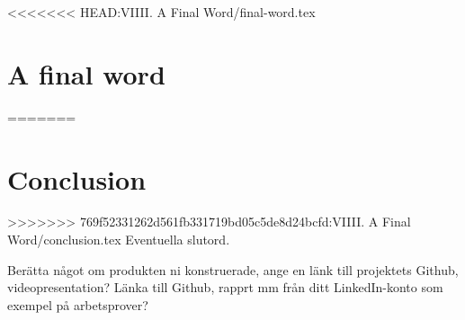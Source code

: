 <<<<<<< HEAD:VIIII. A Final Word/final-word.tex
\section*{A final word}
=======
\section*{Conclusion}
>>>>>>> 769f52331262d561fb331719bd05c5de8d24bcfd:VIIII. A Final Word/conclusion.tex
Eventuella slutord.

Berätta något om produkten ni konstruerade, ange en länk till projektets Github\cite{Eklund:2}, videopresentation?
Länka till Github, rapprt mm från ditt LinkedIn-konto som exempel på arbetsprover?\cite{DUMMY:1}
